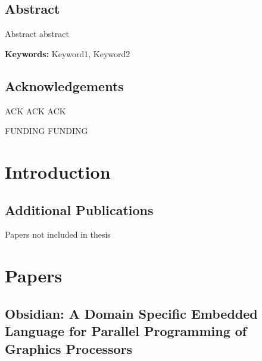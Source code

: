 \documentclass[a4paper]{book}
\begin{document}
%

\clearpage

\section*{Abstract}
Abstract abstract 

\vspace{5mm}

\noindent

\textbf{Keywords:} Keyword1, Keyword2  

\clearpage

\section*{Acknowledgements}
ACK ACK ACK 

\vspace{5mm}

FUNDING FUNDING 


\tableofcontents


\newpage


\chapter{Introduction}


\clearpage{}
\section*{Additional Publications}

Papers not included in thesis







\chapter{Papers}


% 
\cleardoublepage 

\section{Obsidian: A Domain Specific Embedded Language for Parallel Programming of Graphics Processors}
\end{document}
